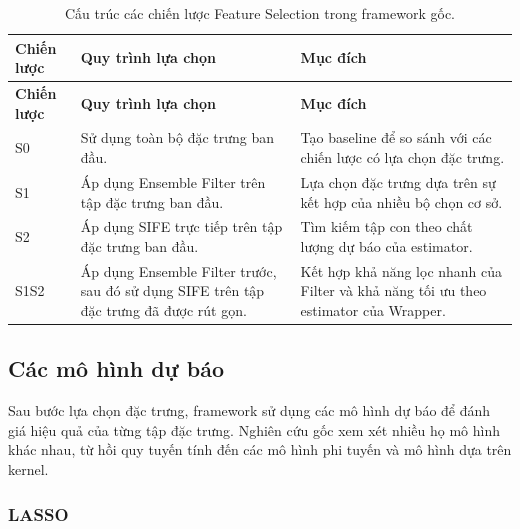 \small
\begin{longtable}{
    @{}
    >{\raggedright\arraybackslash}p{}
    >{\raggedright\arraybackslash}p{}
    >{\raggedright\arraybackslash}p{}
    @{}
}
\caption{Cấu trúc các chiến lược Feature Selection trong framework gốc.}
\label{tab:original-selection-strategies}\\

\toprule
\textbf{Chiến lược}
&
\textbf{Quy trình lựa chọn}
&
\textbf{Mục đích}
\\
\midrule
\endfirsthead

\toprule
\textbf{Chiến lược}
&
\textbf{Quy trình lựa chọn}
&
\textbf{Mục đích}
\\
\midrule
\endhead

\bottomrule
\endlastfoot

S0
&
Sử dụng toàn bộ đặc trưng ban đầu.
&
Tạo baseline để so sánh với các chiến lược có lựa chọn đặc trưng.
\\

S1
&
Áp dụng Ensemble Filter trên tập đặc trưng ban đầu.
&
Lựa chọn đặc trưng dựa trên sự kết hợp của nhiều bộ chọn cơ sở.
\\

S2
&
Áp dụng SIFE trực tiếp trên tập đặc trưng ban đầu.
&
Tìm kiếm tập con theo chất lượng dự báo của estimator.
\\

S1S2
&
Áp dụng Ensemble Filter trước, sau đó sử dụng SIFE trên tập
đặc trưng đã được rút gọn.
&
Kết hợp khả năng lọc nhanh của Filter và khả năng tối ưu
theo estimator của Wrapper.
\\

\end{longtable}
\normalsize

\subsection{Các mô hình dự báo}
\label{subsec:forecasting-models-original}

Sau bước lựa chọn đặc trưng, framework sử dụng các mô hình dự báo
để đánh giá hiệu quả của từng tập đặc trưng. Nghiên cứu gốc xem xét
nhiều họ mô hình khác nhau, từ hồi quy tuyến tính đến các mô hình
phi tuyến và mô hình dựa trên kernel.

\subsubsection{LASSO}

